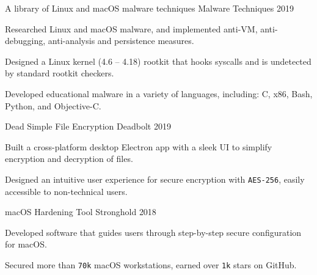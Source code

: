 
\begin{cventries}
\cventry
{A library of Linux and macOS malware techniques} %
{Malware Techniques} %
{2019} %
{} %
{
	\begin{cvitems} %
		\item {Researched Linux and macOS malware, and implemented anti-VM, anti-debugging, anti-analysis and persistence measures.}
		\item {Designed a Linux kernel (4.6 -- 4.18) rootkit that hooks syscalls and is undetected by standard rootkit checkers.}
		\item {Developed educational malware in a variety of languages, including: C, x86, Bash, Python, and Objective-C.}
	\end{cvitems}
}

\cventry
{Dead Simple File Encryption} %
{Deadbolt} %
{2019} %
{} %
{
	\begin{cvitems} %
		\item {Built a cross-platform desktop Electron app with a sleek UI to simplify encryption and decryption of files.}
		\item {Designed an intuitive user experience for secure encryption with \texttt{AES-256}, easily accessible to non-technical users.}
	\end{cvitems}
}

\cventry
{macOS Hardening Tool} %
{Stronghold} %
{2018} %
{} %
{
	\begin{cvitems} %
		\item {Developed software that guides users through step-by-step secure configuration for macOS.}
		\item {Secured more than \texttt{70k} macOS workstations, earned over \texttt{1k} stars on GitHub.}
	\end{cvitems}
}


\end{cventries}
